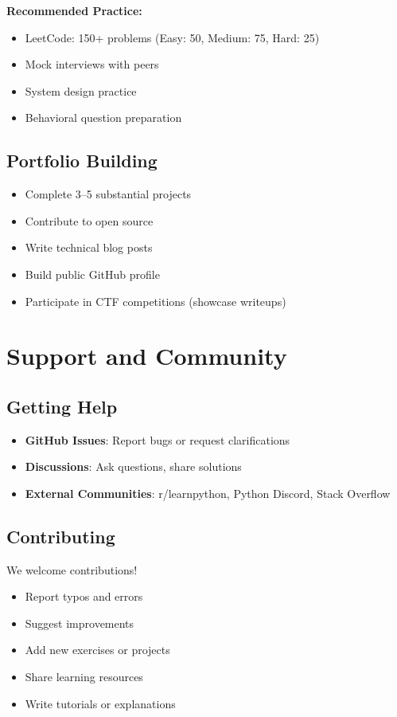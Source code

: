 \documentclass[11pt,letterpaper]{article}
\begin{document}
\textbf{Recommended Practice:}
\begin{itemize}[leftmargin=*]
    \item LeetCode: 150+ problems (Easy: 50, Medium: 75, Hard: 25)
    \item Mock interviews with peers
    \item System design practice
    \item Behavioral question preparation
\end{itemize}

\subsection{Portfolio Building}
\begin{itemize}[leftmargin=*]
    \item Complete 3--5 substantial projects
    \item Contribute to open source
    \item Write technical blog posts
    \item Build public GitHub profile
    \item Participate in CTF competitions (showcase writeups)
\end{itemize}

\section{Support and Community}

\subsection{Getting Help}
\begin{itemize}[leftmargin=*]
    \item \textbf{GitHub Issues}: Report bugs or request clarifications
    \item \textbf{Discussions}: Ask questions, share solutions
    \item \textbf{External Communities}: r/learnpython, Python Discord, Stack Overflow
\end{itemize}

\subsection{Contributing}
We welcome contributions!
\begin{itemize}[leftmargin=*]
    \item Report typos and errors
    \item Suggest improvements
    \item Add new exercises or projects
    \item Share learning resources
    \item Write tutorials or explanations
\end{itemize}
\end{document}
